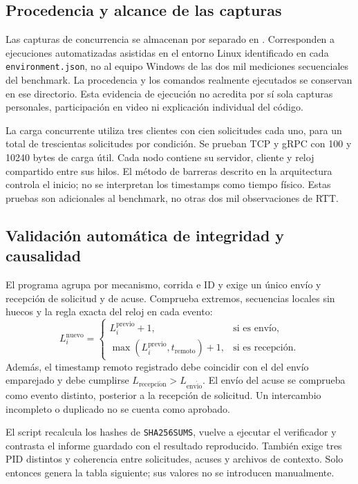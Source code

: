 \subsection{Procedencia y alcance de las capturas}
Las capturas de concurrencia se almacenan por separado en
. Corresponden a ejecuciones automatizadas asistidas
en el entorno Linux identificado en cada \texttt{environment.json}, no al
equipo Windows de las dos mil mediciones secuenciales del benchmark.
La procedencia y los comandos realmente ejecutados se conservan en ese directorio.
Esta evidencia de ejecución no acredita por sí sola capturas personales,
participación en video ni explicación individual del código.

La carga concurrente utiliza tres clientes con cien solicitudes cada uno, para
un total de trescientas solicitudes por condición. Se prueban TCP y gRPC con
100 y 10240 bytes de carga útil. Cada nodo contiene su servidor, cliente y reloj
compartido entre sus hilos. El método de barreras descrito en la arquitectura
controla el inicio; no se interpretan los timestamps como tiempo físico.
Estas pruebas son adicionales al benchmark, no otras dos mil observaciones de RTT.

\subsection{Validación automática de integridad y causalidad}
El programa  agrupa por mecanismo, corrida e ID
y exige un único envío y recepción de solicitud y de acuse. Comprueba extremos,
secuencias locales sin huecos y la regla exacta del reloj en cada evento:
\begin{equation}
L_i^{\mathrm{nuevo}}=
\begin{cases}
L_i^{\mathrm{previo}}+1, & \text{si es envío},\\
\max(L_i^{\mathrm{previo}},t_{\mathrm{remoto}})+1, & \text{si es recepción}.
\end{cases}
\end{equation}
Además, el timestamp remoto registrado debe coincidir con el del envío
emparejado y debe cumplirse $L_{\mathrm{recepci\acute{o}n}}>L_{\mathrm{env\acute{i}o}}$.
El envío del acuse se comprueba como evento distinto, posterior a la recepción
de solicitud. Un intercambio incompleto o duplicado no se cuenta como aprobado.

El script  recalcula los hashes de
\texttt{SHA256SUMS}, vuelve a ejecutar el verificador y contrasta el informe
guardado con el resultado reproducido. También exige tres PID distintos y
coherencia entre solicitudes, acuses y archivos de contexto. Solo entonces genera
la tabla siguiente; sus valores no se introducen manualmente.

